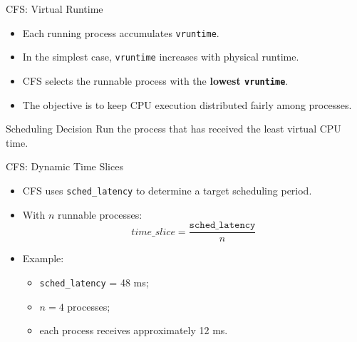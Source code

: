 
\begin{frame}{CFS: Virtual Runtime}
    \begin{itemize}
        \item Each running process accumulates \texttt{vruntime}.
        \item In the simplest case, \texttt{vruntime} increases with physical runtime.
        \item CFS selects the runnable process with the
        \textbf{lowest \texttt{vruntime}}.
        \item The objective is to keep CPU execution distributed fairly among processes.
    \end{itemize}

    \begin{block}{Scheduling Decision}
        Run the process that has received the least virtual CPU time.
    \end{block}
\end{frame}


\begin{frame}{CFS: Dynamic Time Slices}
    \begin{itemize}
        \item CFS uses \texttt{sched\_latency} to determine a target scheduling period.
        \item With $n$ runnable processes:
        \[
            time\_slice =
            \frac{\texttt{sched\_latency}}{n}
        \]

        \item Example:
        \begin{itemize}
            \item \texttt{sched\_latency} = 48 ms;
            \item $n=4$ processes;
            \item each process receives approximately 12 ms.
        \end{itemize}
    \end{itemize}
\end{frame}


